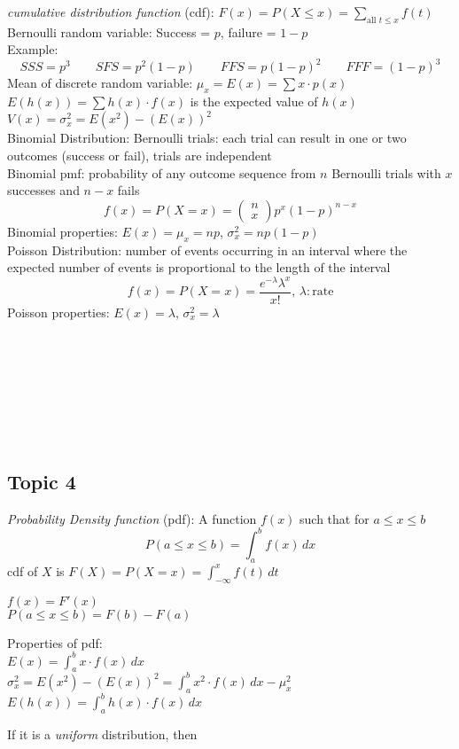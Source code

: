 \documentclass[landscape,10pt]{article}
\begin{document}
\begin{multicols*}{2}
	\textit{cumulative distribution function} (cdf): $ F(x) = P(X \leq x ) = \sum\limits_{\text{all } t \leq x}^{} f(t) $\\
	
	Bernoulli random variable: Success = $ p $, failure = $ 1- p $\\
	Example:
	\[ SSS = p^3 \qquad SFS = p^2(1-p) \qquad FFS = p(1-p)^2 \qquad FFF = (1-p)^3 \]
	Mean of discrete random variable: $ \mu_x = E(x) = \sum x \cdot p(x) $\\
	$ E(h(x)) = \sum h(x) \cdot f(x) $ is the expected value of $ h(x) $\\
	$ V(x) = \sigma_x^2 = E(x^2) - (E(x))^2 $\\
	
	Binomial Distribution: Bernoulli trials: each trial can result in one or two outcomes (success or fail), trials are independent\\
	Binomial pmf: probability of any outcome sequence from $ n $ Bernoulli trials with $ x $ successes and $ n-x $ fails
	\[ f(x) = P(X=x) = \begin{pmatrix} n\\x \end{pmatrix} p^x (1-p)^{n-x} \]
	Binomial properties: $ E(x) = \mu_x = np $, $ \sigma_x^2 = np(1-p) $\\
	
	Poisson Distribution: number of events occurring in an interval where the expected number of events is proportional to the length of the interval
	\[ f(x) = P(X=x) = \frac{e^{-\lambda} \lambda^x}{x!}, \, \lambda: \text{rate} \]
	Poisson properties: $ E(x) = \lambda $, $ \sigma_x^2 = \lambda $\\
	\\
	\\
	\\
	\\	
	\\
	\\
	\\	
	
	\subsection*{Topic 4}
		
	\textit{Probability Density function} (pdf): A function $ f(x) $ such that for $ a \leq x \leq b $
	\[ P(a \leq x \leq b) = \int_{a}^{b} f(x) \, dx \]	
	cdf of $ X $ is $ F(X) = P(X = x) = \int_{-\infty}^{x} f(t)\,dt $
	
	$ f(x) = F'(x) $\\
	$ P(a \leq x \leq b) = F(b) - F(a) $
	
	Properties of pdf:\\
	$ E(x) = \int_{a}^{b} x \cdot f(x) \, dx $\\
	$ \sigma_x^2 = E(x^2) - (E(x))^2 = \int_{a}^{b} x^2 \cdot f(x) \,dx - \mu_x^2 $\\
	$ E(h(x)) = \int_{a}^{b} h(x) \cdot f(x)\,dx $
	
	If it is a \textit{uniform} distribution, then 
		
		
		
	\end{multicols*}
	
	
	
	
	
	
	
	
	
	
\end{document}
